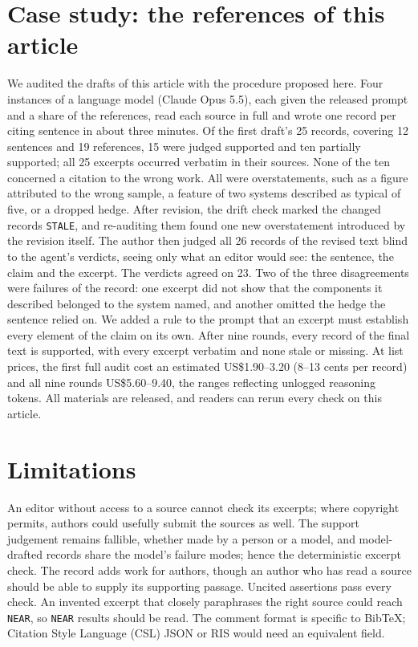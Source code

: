 \documentclass[11pt]{article}
\begin{document}
\section{Case study: the references of this article}

We audited the drafts of this article with the procedure proposed here. Four instances of a language model (Claude Opus 5.5), each given the released prompt and a share of the references, read each source in full and wrote one record per citing sentence in about three minutes. Of the first draft's 25 records, covering 12 sentences and 19 references, 15 were judged supported and ten partially supported; all 25 excerpts occurred verbatim in their sources. None of the ten concerned a citation to the wrong work. All were overstatements, such as a figure attributed to the wrong sample, a feature of two systems described as typical of five, or a dropped hedge. After revision, the drift check marked the changed records \texttt{STALE}, and re-auditing them found one new overstatement introduced by the revision itself. The author then judged all 26 records of the revised text blind to the agent's verdicts, seeing only what an editor would see: the sentence, the claim and the excerpt. The verdicts agreed on 23. Two of the three disagreements were failures of the record: one excerpt did not show that the components it described belonged to the system named, and another omitted the hedge the sentence relied on. We added a rule to the prompt that an excerpt must establish every element of the claim on its own. After nine rounds, every record of the final text is supported, with every excerpt verbatim and none stale or missing. At list prices, the first full audit cost an estimated US\$1.90--3.20 (8--13 cents per record) and all nine rounds US\$5.60--9.40, the ranges reflecting unlogged reasoning tokens. All materials are released, and readers can rerun every check on this article.

\section{Limitations}

An editor without access to a source cannot check its excerpts; where copyright permits, authors could usefully submit the sources as well. The support judgement remains fallible, whether made by a person or a model, and model-drafted records share the model's failure modes; hence the deterministic excerpt check. The record adds work for authors, though an author who has read a source should be able to supply its supporting passage. Uncited assertions pass every check. An invented excerpt that closely paraphrases the right source could reach \texttt{NEAR}, so \texttt{NEAR} results should be read. The comment format is specific to BibTeX; Citation Style Language (CSL) JSON or RIS would need an equivalent field.
\end{document}
